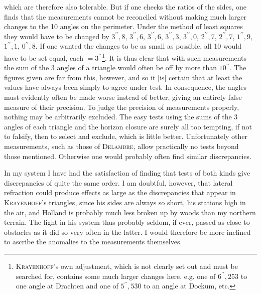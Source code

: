 \begingroup
\makeatletter
\renewcommand{\@makefnmark}{\hbox{\normalfont\textsuperscript{*})}}
\makeatother
\noindent which are therefore also tolerable. But if one checks the
ratios of the sides, one finds that the measurements cannot be reconciled
without making much larger changes to the 10 angles on the perimeter. Under
the method of least squares they would have to be changed by
$3^{\prime\prime}{,}8$, $3^{\prime\prime}{,}6$, $3^{\prime\prime}{,}6$, $3^{\prime\prime}{,}3$, $3^{\prime\prime}{,}0$, $2^{\prime\prime}{,}7$, $2^{\prime\prime}{,}7$,
$1^{\prime\prime}{,}9$, $1^{\prime\prime}{,}1$, $0^{\prime\prime}{,}8$. If one wanted
the changes to be as small as possible, all 10 would have to be set equal,
each $=3^{\prime\prime}$\footnote{\textsc{Krayenhoff}'s own adjustment, which is not clearly set out and must be searched for, contains some much larger changes here, e.g. one of $6^{\prime\prime}{,}253$ to one angle at Drachten and one of $5^{\prime\prime}{,}530$ to an angle at Dockum, etc.}.
It is thus clear that with such measurements the sum of the 3 angles of
a triangle would often be off by more than $10^{\prime\prime}$. The figures
given are far from this, however, and so it [is] certain that at least the
values have always been  simply to agree under
 test. In consequence, the angles must evidently often
be made worse instead of better, giving an entirely false measure of their
precision. To judge the precision of measurements properly, nothing may
be arbitrarily excluded. The easy tests using the sums of the 3 angles of
each triangle and the horizon closure are surely all too tempting, if
not to falsify, then to select and exclude, which is little better.
Unfortunately other measurements, such as those of \textsc{Delambre},
allow practically no tests beyond those mentioned. Otherwise one would
probably often find similar discrepancies.

In my system I have had the satisfaction of finding that tests of both
kinds give discrepancies of quite the same order. I am doubtful, however,
that lateral refraction could produce effects as large as the discrepancies
that appear in \textsc{Krayenhoff}'s triangles, since his sides are always so
short, his stations high in the air, and Holland is probably much less broken
up by woods than my northern terrain. The light in his system thus probably
seldom, if ever, passed as close to obstacles as it did so very often in the
latter. I would therefore be more inclined to ascribe the anomalies to
the measurements themselves.
\endgroup
